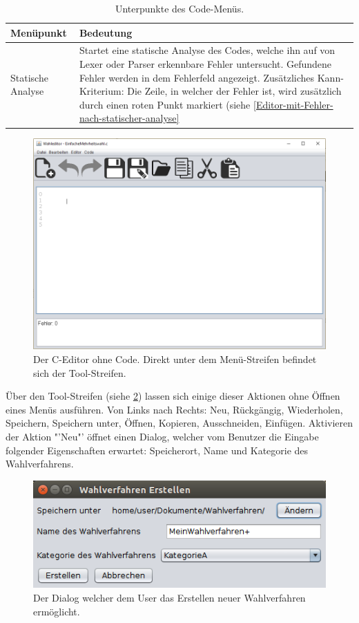 \documentclass[a4paper]{scrreprt}
\begin{document}
\begin{table}[H]
\begin{tabular}{|p{3cm}|p{12cm}|}
Menüpunkt & Bedeutung \\
\hline
Statische Analyse & Startet eine statische Analyse des Codes, welche ihn auf von Lexer oder Parser erkennbare Fehler untersucht. Gefundene Fehler werden in dem Fehlerfeld angezeigt. Zusätzliches Kann-Kriterium: Die Zeile, in welcher der Fehler ist, wird zusätzlich durch einen roten Punkt markiert (siehe \ref{Editor-mit-Fehler-nach-statischer-analyse}
\end{tabular}
\label{Editor-Menüpunkte}
\caption{Unterpunkte des Code-Menüs.}
\end{table}

\begin{figure}[H]
\includegraphics[scale=0.5]{Editor-ohne-text.png}
\caption{Der C-Editor ohne Code. Direkt unter dem Menü-Streifen befindet sich der Tool-Streifen.}
\label{C-Editor-Tool-Streifen}
\end{figure}

Über den Tool-Streifen (siehe \ref{C-Editor-Tool-Streifen}) lassen sich einige dieser Aktionen ohne Öffnen eines Menüs ausführen. Von Links nach Rechts: Neu, Rückgängig, Wiederholen, Speichern, Speichern unter, Öffnen, Kopieren, Ausschneiden, Einfügen. Aktivieren der Aktion "'Neu"' öffnet einen Dialog, welcher vom Benutzer die Eingabe folgender Eigenschaften erwartet: Speicherort, Name und Kategorie des Wahlverfahrens.

\begin{figure}[H]
\includegraphics[scale=0.5]{Wahlverfahren-Erstellen.png}
\caption{Der Dialog welcher dem User das Erstellen neuer Wahlverfahren ermöglicht.}
\label{C-Editor-Tool-Streifen}
\end{figure}
\end{document}
